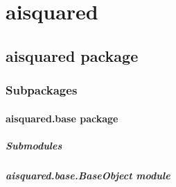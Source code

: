 \documentclass[letterpaper,10pt,english]{sphinxmanual}
\begin{document}
\sphinxstepscope


\section{aisquared}
\label{\detokenize{modules:aisquared}}\label{\detokenize{modules::doc}}
\sphinxstepscope


\subsection{aisquared package}
\label{\detokenize{aisquared:aisquared-package}}\label{\detokenize{aisquared::doc}}

\subsubsection{Subpackages}
\label{\detokenize{aisquared:subpackages}}
\sphinxstepscope


\paragraph{aisquared.base package}
\label{\detokenize{aisquared.base:aisquared-base-package}}\label{\detokenize{aisquared.base::doc}}

\subparagraph{Submodules}
\label{\detokenize{aisquared.base:submodules}}

\subparagraph{aisquared.base.BaseObject module}
\label{\detokenize{aisquared.base:module-aisquared.base.BaseObject}}\label{\detokenize{aisquared.base:aisquared-base-baseobject-module}}
\end{document}
